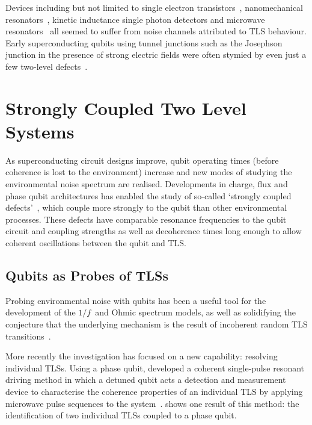 Devices including but not limited to single electron transistors~\cite{Zimmerli1992}, nanomechanical resonators~\cite{Ahn2003}, kinetic inductance single photon detectors and microwave resonators~\cite{Gao2007} all seemed to suffer from noise channels attributed to TLS behaviour.
Early superconducting qubits using tunnel junctions such as the Josephson junction in the presence of strong electric fields were often stymied by even just a few two-level defects~\cite{Simmonds2004}.

\section{Strongly Coupled Two Level Systems}

As superconducting circuit designs improve, qubit operating times (before coherence is lost to the environment) increase and new modes of studying the environmental noise spectrum are realised.
Developments in charge, flux and phase qubit architectures has enabled the study of so-called `strongly coupled defects'~\cite{Neeley2008, Lupascu2009, Lisenfeld2010}, which couple more strongly to the qubit than other environmental processes.
These defects have comparable resonance frequencies to the qubit circuit and coupling strengths as well as decoherence times long enough to allow coherent oscillations between the qubit and TLS.

\subsection{Qubits as Probes of TLSs}\label{sec:probes}

Probing environmental noise with qubits has been a useful tool for the development of the $1/f\,$ and Ohmic spectrum models, as well as solidifying the conjecture that the underlying mechanism is the result of incoherent random TLS transitions~\cite{Shnirman2005}.

More recently the investigation has focused on a new capability: resolving individual TLSs.
Using a phase qubit, \citeauthor{Lisenfeld2010} developed a coherent single-pulse resonant driving method in which a detuned qubit acts a detection and measurement device to characterise the coherence properties of an individual TLS by applying microwave pulse sequences to the system~\cite{Lisenfeld2010}.  shows one result of this method: the identification of two individual TLSs coupled to a phase qubit.

